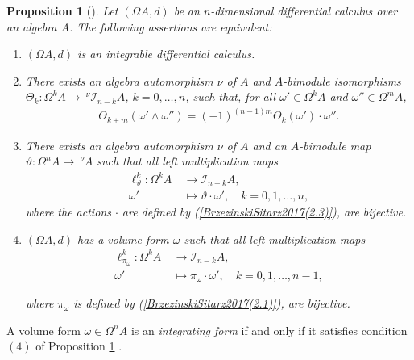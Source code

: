 \documentclass{amsart}
\newtheorem{proposition}[theorem]{Proposition}
\theoremstyle{definition}
\theoremstyle{remark}
\numberwithin{equation}{section}
\begin{document}
\begin{proposition}[{\cite[Theorem 2.2]{BrzezinskiSitarz2017}}]\label{integrableequiva} 
Let $(\Omega A, d)$ be an $n$-dimensional differential calculus over an algebra $A$. The following assertions are equivalent:
\begin{enumerate}
    \item [\rm (1)] $(\Omega A, d)$ is an integrable differential calculus.
    
    \item [\rm (2)] There exists an algebra automorphism $\nu$ of $A$ and $A$-bimodule isomorphisms $\Theta_k : \Omega^k A \rightarrow \ ^{\nu}\mathcal{I}_{n-k}A$, $k =0, \ldots, n$, such that, for all $\omega'\in \Omega^k A$ and $\omega''\in \Omega^mA$,
    \begin{align*}
        \Theta_{k+m}(\omega'\wedge\omega'')=(-1)^{(n-1)m}\Theta_k(\omega')\cdot\omega''.
    \end{align*}
    
    \item [\rm (3)] There exists an algebra automorphism $\nu$ of $A$ and an $A$-bimodule map $\vartheta:\Omega^nA\rightarrow\ ^{\nu}A$ such that all left multiplication maps
    \begin{align*}
    \ell_{\vartheta}^{k}:\Omega^k A &\ \rightarrow \mathcal{I}_{n-k}A, \\
    \omega' &\ \mapsto \vartheta\cdot\omega', \quad k = 0, 1, \dotsc, n,
    \end{align*}
    where the actions $\cdot$ are defined by {\rm (}\ref{BrzezinskiSitarz2017(2.3)}{\rm )}, are bijective.
    
    \item [\rm (4)] $(\Omega A, d)$ has a volume form $\omega$ such that all left multiplication maps
    \begin{align*}
        \ell_{\pi_{\omega}}^{k}:\Omega^k A &\ \rightarrow \mathcal{I}_{n-k}A, \\
        \omega' &\ \mapsto \pi_{\omega} \cdot \omega', \quad k=0,1, \dotsc, n-1,
    \end{align*}
    
    where $\pi_{\omega}$ is defined by {\rm (}\ref{BrzezinskiSitarz2017(2.1)}{\rm )}, are bijective.
\end{enumerate}
\end{proposition}

A volume form $\omega\in \Omega^nA$ is an {\em integrating form} if and only if it satisfies condition $(4)$ of Proposition \ref{integrableequiva} \cite[Remark 2.3]{BrzezinskiSitarz2017}.
\end{document}
